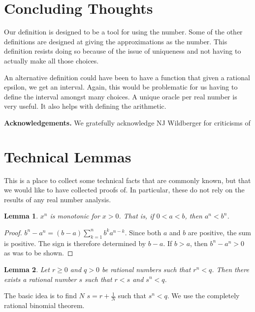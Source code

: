 \documentclass[12pt]{article}
\newtheorem{lemma}{Lemma}
\theoremstyle{remark}
\begin{document}
\section{Concluding Thoughts}

Our definition is designed to be a tool for using the number. Some of the other definitions are designed at giving the approximations as the number. This definition resists doing so because of the issue of uniqueness and not having to actually make all those choices. 

An alternative definition could have been to have a function that given a rational epsilon, we get an interval. Again, this would be problematic for us having to define the interval amongst many choices. A unique oracle per real number is very useful. It also helps with defining the arithmetic. 


\bigskip

\noindent \textbf{Acknowledgements. } We gratefully acknowledge NJ Wildberger for criticisms of 

\appendix

\section{Technical Lemmas}\label{app:A}

This is a place to collect some technical facts that are commonly known, but that we would like to have collected proofs of. In particular, these do not rely on the results of any real number analysis. 

\begin{lemma}
$x^n$ is monotonic for $x>0$. That is, if $0 < a < b$, then $a^n<b^n$.
\end{lemma}

\begin{proof}
$b^n-a^n= (b-a)\sum_{k=1}^n b^k a^{n-k}$. Since both $a$ and $b$ are positive, the sum is positive. The sign is therefore determined by $b-a$. If $b>a$, then $b^n-a^n > 0$ as was to be shown. 
\end{proof}

\begin{lemma}\label{app:lesser}
Let $r \geq 0 $ and $q > 0$ be rational numbers such that $r^n < q$. Then there exists a rational number $s$ such that $r < s$ and $s^n < q$.
\end{lemma}

The basic idea is to find $N$ $s = r + \tfrac{1}{N}$ such that $s^n < q$. We use the completely rational binomial theorem.  
\end{document}
